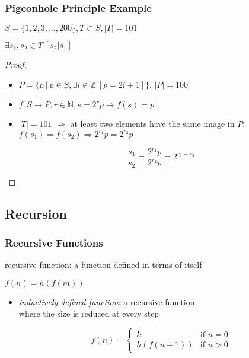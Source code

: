 \documentclass[dvipsnames]{beamer}
\begin{document}
\begin{frame}
  \frametitle{Pigeonhole Principle Example}

  \begin{theorem}
    $S = \{1,2,3,\dots,200\}, T \subset S, |T| = 101$

    $\exists s_1,s_2 \in T~[s_2 | s_1]$
  \end{theorem}

  \pause
  \begin{proof}
    \begin{itemize}
      \item $P=\{p~|~p \in S, \exists i \in \mathbb{Z}~[p=2i+1]\}$, $|P|=100$

      \pause
      \item $f: S \rightarrow P, r \in \mathbb{N}, s = 2^r p \rightarrow f(s) = p$
      \item $|T|=101$ $\Rightarrow$ at least two elements have the same image in $P$:\\
        $f(s_1)=f(s_2) \Rightarrow 2^{r_1} p = 2^{r_2} p$

      \pause
      \[
        \frac {s_1} {s_2} = \frac {2^{r_1} p} {2^{r_2} p} = 2^{r_1 - r_2}
      \]
    \end{itemize}
  \end{proof}
\end{frame}

\subsection{Recursion}

\begin{frame}
  \frametitle{Recursive Functions}

  \begin{definition}
    \alert{recursive function}: a function defined in terms of itself

    \medskip
    $f(n) = h(f(m))$
  \end{definition}

  \begin{itemize}
    \item \emph{inductively defined function}: a recursive function\\
      where the size is reduced at every step

    \medskip
    \[
      f(n) =
        \begin{cases}
          k         & \mbox{if } n = 0\\
          h(f(n-1)) & \mbox{if } n > 0
        \end{cases}
    \]
  \end{itemize}
\end{frame}
\end{document}
